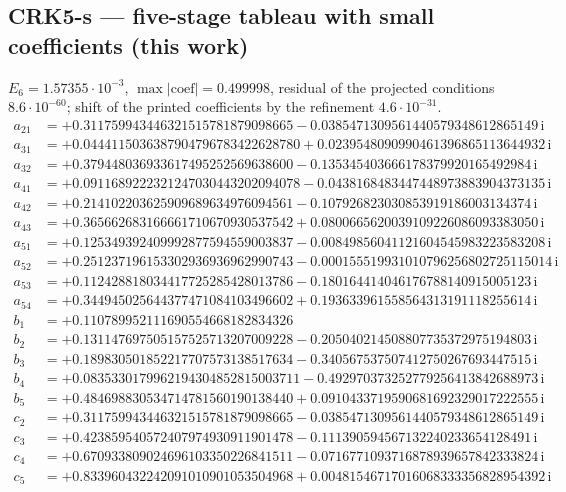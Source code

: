 \subsection*{CRK5-s --- five-stage tableau with small coefficients (this work)}
$E_{6}=1.57355\cdot10^{-3}$, $\max|\text{coef}|=0.499998$, residual of the projected conditions $8.6\cdot10^{-60}$; shift of the printed coefficients by the refinement $4.6\cdot10^{-31}$. 
{\small
\begin{align*}
a_{21} &= +0.311759943446321515781879098665 - 0.0385471309561440579348612865149\,\mathrm{i}\\
a_{31} &= +0.0444115036387904796783422628780 + 0.0239548090990461396865113644932\,\mathrm{i}\\
a_{32} &= +0.379448036933617495252569638600 - 0.135345403666178379920165492984\,\mathrm{i}\\
a_{41} &= +0.0911689222321247030443202094078 - 0.0438168483447448973883904373135\,\mathrm{i}\\
a_{42} &= +0.214102203625909689634976094561 - 0.107926823030853919186003134374\,\mathrm{i}\\
a_{43} &= +0.365662683166661710670930537542 + 0.0800665620039109226086093383050\,\mathrm{i}\\
a_{51} &= +0.125349392409992877594559003837 - 0.00849856041121604545983223583208\,\mathrm{i}\\
a_{52} &= +0.251237196153302936936962990743 - 0.000155519931010796256802725115014\,\mathrm{i}\\
a_{53} &= +0.112428818034417725285428013786 - 0.180164414046176788140915005123\,\mathrm{i}\\
a_{54} &= +0.344945025644377471084103496602 + 0.193633961558564313191118255614\,\mathrm{i}\\[1mm]
b_{1} &= +0.110789952111690554668182834326\\
b_{2} &= +0.131147697505157525713207009228 - 0.205040214508807735372975194803\,\mathrm{i}\\
b_{3} &= +0.189830501852217707573138517634 - 0.340567537507412750267693447515\,\mathrm{i}\\
b_{4} &= +0.0835330179962194304852815003711 - 0.492970373252779256413842688973\,\mathrm{i}\\
b_{5} &= +0.484698830534714781560190138440 + 0.0910433719590681692329017222555\,\mathrm{i}\\[1mm]
c_{2} &= +0.311759943446321515781879098665 - 0.0385471309561440579348612865149\,\mathrm{i}\\
c_{3} &= +0.423859540572407974930911901478 - 0.111390594567132240233654128491\,\mathrm{i}\\
c_{4} &= +0.670933809024696103350226841511 - 0.0716771093716878939657842333824\,\mathrm{i}\\
c_{5} &= +0.833960432242091010901053504968 + 0.00481546717016068333356828954392\,\mathrm{i}
\end{align*}
}

